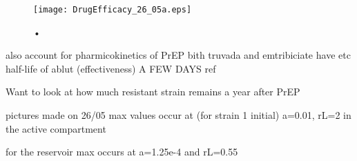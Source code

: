 \documentclass[DIV=15]{scrartcl}
\begin{document}










\iffalse
 viral load high during acute phase not much evidence of transmission 


To model the {\ae}ffect of Pre-Exposure Prophylaxis (PrEP) it is further assumed that the replication rate $\gamma$ depends on the amount of antiviral drug present in the host.

\fi




\begin{figure}[h]
 \begin{center}
 \texttt{[image: DrugEfficacy\_26\_05a.eps]}
 \end{center}
 \caption{•}
 \label{Drug efficacy}
 \end{figure}
 
also account for pharmicokinetics of PrEP bith truvada and emtribiciate have etc half-life of ablut (effectiveness) A  FEW DAYS ref



Want to look  at how much resistant strain remains a year after PrEP


\iffalse
pictures made on  26/05 max values occur at (for strain 1 initial) a=0.01, rL=2 in the active compartment

for the reservoir max occurs at a=1.25e-4 and rL=0.55
\end{document}
